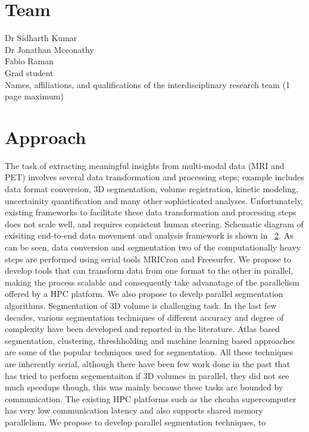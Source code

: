 \documentclass[11pt]{article}
\begin{document}
\section{Team}
Dr Sidharth Kumar \\
Dr Jonathan Mcconathy \\
Fabio Raman \\
Grad student \\
Names, affiliations, and qualifications of the interdisciplinary research team (1 page maximum)

\section{Approach}

The task of extracting meaningful insights from multi-modal data (MRI and PET) involves several data transformation and processing steps;
example includes data format conversion, 3D segmentation, volume registration, kinetic modeling, uncertainity quantification and many other sophisticated analyses.
Unfortunately, existing frameworks to facilitate these data transformation and processing steps does not scale well, and requires consistent human steering. 
Schematic diagram of exisiting end-to-end data movement and analysis framework is shown in ~\ref{}. As can be seen, data conversion and segmentation two of the computationally heavy steps are performed using serial tools MRICron and Freesurfer. We propose to develop tools that can transform data from one format to the other in parallel, making the process scalable and consequently take advanatage of the parallelism offered by a HPC platform. We also propose to develp parallel segmentation algorithms. Segmentation of 3D volume is challenging task.
In the last few decades, various segmentation techniques of different accuracy and degree of complexity have been developed and reported in the literature. Atlas based segmentation, clustering, threshholding and machine learning based approaches are some of the popular techniques used for segmentation. All these techniques are inherently serial, although there have been few work done in the past that has tried to perform segementaiton if 3D volumes in parallel, they did not see much speedups though, this was mainly because these tasks are bounded by communication. The existing HPC platforms such as the cheaha supercomputer has very low communication latency and also supports shared memory parallelism. We propose to develop parallel segmentation techniques, to 
\end{document}
